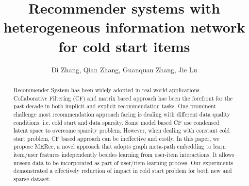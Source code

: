 \documentclass{ws-procs9x6}            %
\begin{document}
\title{Recommender systems with heterogeneous information network for cold start items}

\author{Di Zhang, Qian Zhang, Guanquan Zhang, Jie Lu}

\address{\textit{Decision Systems and e-Service Intelligence Laboratory,} \\
\textit{Centre for Artificial Intelligence}\\
University of Technology Sydney, Australia \\
Di.Zhang-7@student.uts.edu.au, Qian.Zhang-1@uts.edu.au \\
Guangquan.Zhang@uts.edu.au, Jie.Lu@uts.edu.au}

\begin{abstract}
Recommender System has been widely adopted in real-world applications. Collaborative Filtering (CF) and matrix based approach has been the forefront for the past decade in both implicit and explicit recommendation tasks. One prominent challenge most recommendation approach facing is dealing with different data quality conditions. i.e. cold start and data sparsity. Some model based CF use condensed latent space to overcome sparsity problem. However, when dealing with constant cold start problem, CF based approach can be ineffective and costly. In this paper, we propose MERec, a novel approach that adopts graph meta-path embedding to learn item/user features independently besides learning from user-item interactions. It allows unseen data to be incorporated as part of user/item learning process. Our experiments demonstrated a effectively reduction of impact in cold start problem for both new and sparse dataset.
\end{abstract}


\bodymatter
















\end{document}
